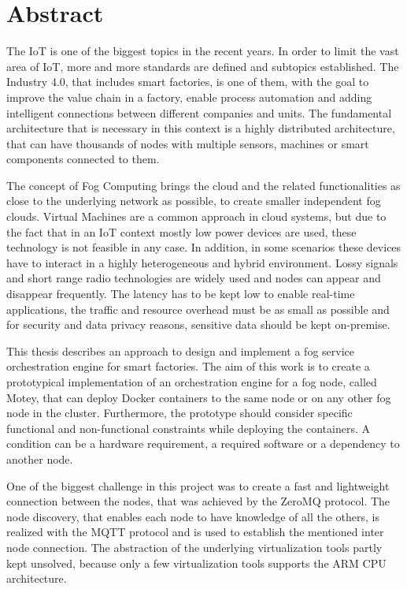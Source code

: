 \chapter*{Abstract}\label{chapter:abstract}
The \ac{IoT} is one of the biggest topics in the recent years.
In order to limit the vast area of \ac{IoT}, more and more standards are defined and subtopics established.
The Industry 4.0, that includes smart factories, is one of them, with the goal to improve the value chain in a factory, enable process automation and adding intelligent connections between different companies and units.
The fundamental architecture that is necessary in this context is a highly distributed architecture, that can have thousands of nodes with multiple sensors, machines or smart components connected to them.

The concept of Fog Computing brings the cloud and the related functionalities as close to the underlying network as possible, to create smaller independent fog clouds.
Virtual Machines are a common approach in cloud systems, but due to the fact that in an \ac{IoT} context mostly low power devices are used, these technology is not feasible in any case.
In addition, in some scenarios these devices have to interact in a highly heterogeneous and hybrid environment.
Lossy signals and short range radio technologies are widely used and nodes can appear and disappear frequently.
The latency has to be kept low to enable real-time applications, the traffic and resource overhead must be as small as possible and for security and data privacy reasons, sensitive data should be kept on-premise.

This thesis describes an approach to design and implement a fog service orchestration engine for smart factories.
The aim of this work is to create a prototypical implementation of an orchestration engine for a fog node, called Motey, that can deploy Docker containers to the same node or on any other fog node in the cluster.
Furthermore, the prototype should consider specific functional and non-functional constraints while deploying the containers.
A condition can be a hardware requirement, a required software or a dependency to another node.

One of the biggest challenge in this project was to create a fast and lightweight connection between the nodes, that was achieved by the ZeroMQ protocol.
The node discovery, that enables each node to have knowledge of all the others, is realized with the \acs{MQTT} protocol and is used to establish the mentioned inter node connection.
The abstraction of the underlying virtualization tools partly kept unsolved, because only a few virtualization tools supports the ARM \acs{CPU} architecture.

